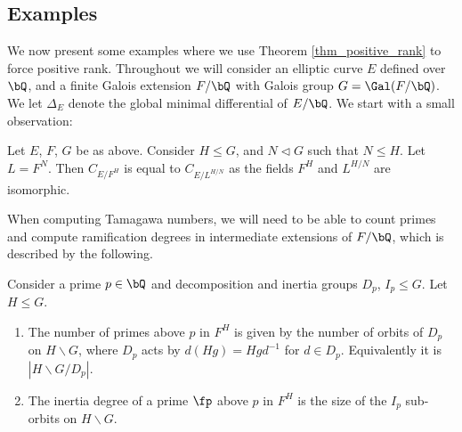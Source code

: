 \subsection{Examples}

We now present some examples where we use Theorem \ref{thm_positive_rank} to force positive rank. Throughout we will consider an elliptic curve $E$ defined over $\bQ$, and a finite Galois extension $F / \bQ$ with Galois group $G = \Gal(F / \bQ)$. We let $\Delta_E$ denote the global minimal differential of $E / \bQ$. 
We start with a small observation:

\begin{rem}
   Let $E$, $F$, $G$ be as above. Consider $H \leq G$, and $N \triangleleft G$ such that $N \leq H$. Let $L = F^N$. Then $C_{E / F^H}$ is equal to $C_{E / L^{H/N}}$ as the fields $F^H$ and $L^{H/ N}$ are isomorphic. 
    
\end{rem}



When computing Tamagawa numbers, we will need to be able to count primes and compute ramification degrees in intermediate extensions of $F / \bQ$, which is described by the following. 

\begin{exercise}\label{ex-counting}
Consider a prime $p \in \bQ$ and decomposition and inertia groups $D_p$, $I_p \leq G$. Let $H \leq G$. 
\begin{enumerate}
    \setlength\itemsep{0em}
    \item The number of primes above $p$ in $F^H$ is given by the number of orbits of $D_p$ on $H \backslash G$, where $D_p$ acts by $d(Hg) = H g d^{-1}$ for $d \in D_p$. Equivalently it is $|H \backslash G / D_p|$.
    \item The inertia degree of a prime $\fp$ above $p$ in $F^H$ is the size of the $I_p$ sub-orbits on $H \backslash G$. 
\end{enumerate}
\end{exercise}


